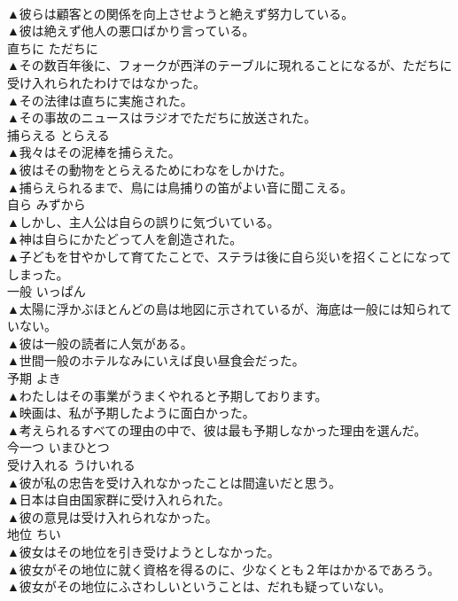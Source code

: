 \documentclass[8pt]{extreport}
\begin{document}
\begin{CJK}{UTF8}{min}
\\	▲彼らは顧客との関係を向上させようと絶えず努力している。 
\\	▲彼は絶えず他人の悪口ばかり言っている。 
\\	直ちに	ただちに	
\\	▲その数百年後に、フォークが西洋のテーブルに現れることになるが、ただちに受け入れられたわけではなかった。 
\\	▲その法律は直ちに実施された。 
\\	▲その事故のニュースはラジオでただちに放送された。 
\\	捕らえる	とらえる	
\\	▲我々はその泥棒を捕らえた。 
\\	▲彼はその動物をとらえるためにわなをしかけた。 
\\	▲捕らえられるまで、鳥には鳥捕りの笛がよい音に聞こえる。 
\\	自ら	みずから	
\\	▲しかし、主人公は自らの誤りに気づいている。 
\\	▲神は自らにかたどって人を創造された。 
\\	▲子どもを甘やかして育てたことで、ステラは後に自ら災いを招くことになってしまった。 
\\	一般	いっぱん	
\\	▲太陽に浮かぶほとんどの島は地図に示されているが、海底は一般には知られていない。 
\\	▲彼は一般の読者に人気がある。 
\\	▲世間一般のホテルなみにいえば良い昼食会だった。 
\\	予期	よき	
\\	▲わたしはその事業がうまくやれると予期しております。 
\\	▲映画は、私が予期したように面白かった。 
\\	▲考えられるすべての理由の中で、彼は最も予期しなかった理由を選んだ。 
\\	今一つ	いまひとつ	
\\	受け入れる	うけいれる	
\\	▲彼が私の忠告を受け入れなかったことは間違いだと思う。 
\\	▲日本は自由国家群に受け入れられた。 
\\	▲彼の意見は受け入れられなかった。 
\\	地位	ちい	
\\	▲彼女はその地位を引き受けようとしなかった。 
\\	▲彼女がその地位に就く資格を得るのに、少なくとも２年はかかるであろう。 
\\	▲彼女がその地位にふさわしいということは、だれも疑っていない。 

\end{CJK}
\end{document}
